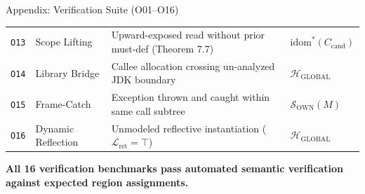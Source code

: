 \documentclass[11pt]{beamer}
\begin{document}
\begin{frame}{Appendix: Verification Suite (O01--O16)}
\begin{table}[h]
\begin{tabular}{@{}llp{5.5cm}l@{}}
      \texttt{O13} & Scope Lifting & Upward-exposed read without prior must-def (Theorem 7.7) & $\text{idom}^*(C_{\text{cand}})$ \\
      \texttt{O14} & Library Bridge & Callee allocation crossing un-analyzed JDK boundary & $\mathcal{H}_{\text{GLOBAL}}$ \\
      \texttt{O15} & Frame-Catch & Exception thrown and caught within same call subtree & $\mathcal{S}_{\text{OWN}}(M)$ \\
      \texttt{O16} & Dynamic Reflection & Unmodeled reflective instantiation ($\mathcal{L}_{\text{ret}} = \top$) & $\mathcal{H}_{\text{GLOBAL}}$ \\
      \bottomrule
    \end{tabular}
  \end{table}
  \vspace{-0.4em}
  \centering
  {\scriptsize\color{darkblue}\textbf{All 16 verification benchmarks pass automated semantic verification against expected region assignments.}}
\end{frame}
\end{document}
